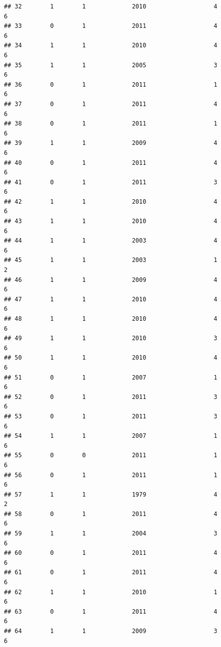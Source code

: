 \documentclass[
]{article}
\begin{document}
\begin{verbatim}
## 32        1        1             2010                   4                 6
## 33        0        1             2011                   4                 6
## 34        1        1             2010                   4                 6
## 35        1        1             2005                   3                 6
## 36        0        1             2011                   1                 6
## 37        0        1             2011                   4                 6
## 38        0        1             2011                   1                 6
## 39        1        1             2009                   4                 6
## 40        0        1             2011                   4                 6
## 41        0        1             2011                   3                 6
## 42        1        1             2010                   4                 6
## 43        1        1             2010                   4                 6
## 44        1        1             2003                   4                 6
## 45        1        1             2003                   1                 2
## 46        1        1             2009                   4                 6
## 47        1        1             2010                   4                 6
## 48        1        1             2010                   4                 6
## 49        1        1             2010                   3                 6
## 50        1        1             2010                   4                 6
## 51        0        1             2007                   1                 6
## 52        0        1             2011                   3                 6
## 53        0        1             2011                   3                 6
## 54        1        1             2007                   1                 6
## 55        0        0             2011                   1                 6
## 56        0        1             2011                   1                 6
## 57        1        1             1979                   4                 2
## 58        0        1             2011                   4                 6
## 59        1        1             2004                   3                 6
## 60        0        1             2011                   4                 6
## 61        0        1             2011                   4                 6
## 62        1        1             2010                   1                 6
## 63        0        1             2011                   4                 6
## 64        1        1             2009                   3                 6

\end{verbatim}
\end{document}

